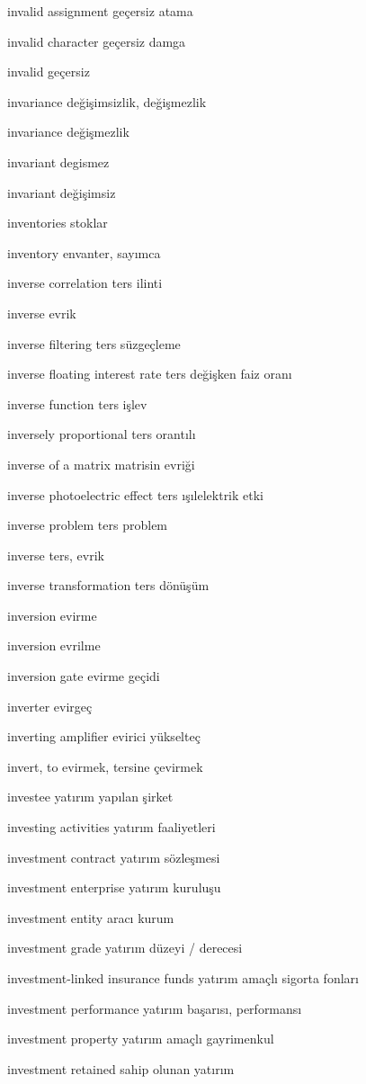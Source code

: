 \documentclass[12pt,fleqn]{article}\usepackage{../../common}
\begin{document}
invalid assignment geçersiz atama

invalid character geçersiz damga

invalid geçersiz

invariance değişimsizlik, değişmezlik

invariance değişmezlik

invariant degismez

invariant değişimsiz

inventories stoklar

inventory envanter, sayımca

inverse correlation ters ilinti

inverse evrik

inverse filtering ters süzgeçleme

inverse floating interest rate ters değişken faiz oranı

inverse function ters işlev

inversely proportional ters orantılı

inverse of a matrix matrisin evriği

inverse photoelectric effect ters ışılelektrik etki

inverse problem ters problem

inverse ters, evrik

inverse transformation ters dönüşüm

inversion evirme

inversion evrilme

inversion gate evirme geçidi

inverter evirgeç

inverting amplifier evirici yükselteç

invert, to evirmek, tersine çevirmek

investee yatırım yapılan şirket

investing activities yatırım faaliyetleri

investment contract yatırım sözleşmesi

investment enterprise yatırım kuruluşu

investment entity aracı kurum

investment grade yatırım düzeyi / derecesi

investment-linked insurance funds yatırım amaçlı sigorta fonları

investment performance yatırım başarısı, performansı

investment property yatırım amaçlı gayrimenkul

investment retained sahip olunan yatırım
\end{document}
